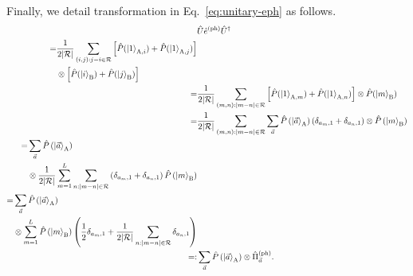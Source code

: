 \documentclass[twocolumn,superscriptaddress,pra,footinbib,notitlepage]{revtex4-1}
\newcommand{\1}{\mbox{1}\hspace{-0.25em}\mbox{l}}
\newcommand{\abs}[1]{\lvert#1\rvert}
\begin{document}
Finally, we detail transformation in Eq.~\eqref{eq:unitary-eph} as follows.
\begin{align}
&\hat{U}\hat{e}^{(\textrm{ph})}\hat{U}^\dagger\nonumber\\
\begin{split}
=&\frac{1}{2\abs{\mathcal{R}}}\sum_{(i, j):j-i\in\mathcal{R}}\left[\hat{P}(\ket{1}_{\textrm{A}, i})+\hat{P}(\ket{1}_{\textrm{A}, j})\right]\\
&\otimes\left[\hat{P}(\ket{i}_\textrm{B})+\hat{P}(\ket{j}_\textrm{B})\right]
\end{split}\nonumber\\
=&\frac{1}{2\abs{\mathcal{R}}}\sum_{(m, n):\abs{m-n}\in\mathcal{R}}\left[\hat{P}(\ket{1}_{\textrm{A}, m})+\hat{P}(\ket{1}_{\textrm{A}, n})\right]\otimes\hat{P}(\ket{m}_\textrm{B})\nonumber\\
=&\frac{1}{2\abs{\mathcal{R}}}\sum_{(m, n):\abs{m-n}\in\mathcal{R}}\sum_{\vec{a}}\hat{P}\left(\ket{\vec{a}}_\textrm{A}\right)\left(\delta_{a_m, 1}+\delta_{a_n, 1}\right)\otimes\hat{P}\left(\ket{m}_\textrm{B}\right)\nonumber\\
\begin{split}
=&\sum_{\vec{a}}\hat{P}\left(\ket{\vec{a}}_\textrm{A}\right)\\
&\otimes\frac{1}{2\abs{\mathcal{R}}}\sum_{m=1}^L\sum_{n:\abs{m-n}\in\mathcal{R}}\left(\delta_{a_m, 1}+\delta_{a_n, 1}\right)\hat{P}\left(\ket{m}_\textrm{B}\right)
\end{split}\nonumber\\
\begin{split}
=&\sum_{\vec{a}}\hat{P}\left(\ket{\vec{a}}_\textrm{A}\right)\\
&\otimes\sum_{m=1}^L\hat{P}\left(\ket{m}_\textrm{B}\right)\left(\frac{1}{2}\delta_{a_m, 1}+\frac{1}{2\abs{\mathcal{R}}}\sum_{n:\abs{m-n}\in\mathcal{R}}\delta_{a_n, 1}\right)
\end{split}\nonumber\\
=:&\sum_{\vec{a}}\hat{P}\left(\ket{\vec{a}}_\textrm{A}\right)\otimes\hat{\Pi}_{\vec{a}}^{(\textrm{ph})}.
\end{align}
\end{document}
